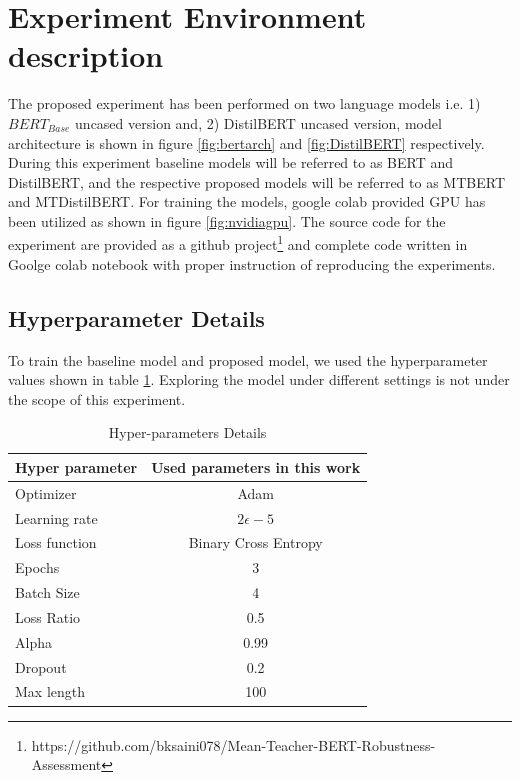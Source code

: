 \documentclass[%
	BCOR=8mm, %
	DIV=12,
	toc=bibliography, %
	toc=listof, %
	oneside, %
	egregdoesnotlikesansseriftitles, %
	]{scrbook}
\begin{document}
\section{Experiment Environment description}
\label{section: experimentenv}
The proposed experiment has been performed on two language models i.e. 1) $BERT_{Base}$ uncased version  and, 2) DistilBERT uncased version, model architecture is shown in figure \ref{fig:bertarch} and \ref{fig:DistilBERT} respectively. During this experiment baseline models will be referred to as BERT and DistilBERT, and the respective proposed models will be referred to as MTBERT and MTDistilBERT. For training the models, google colab provided GPU has been utilized as shown in figure \ref{fig:nvidiagpu}. The source code for the experiment are provided as a github project\footnote{https://github.com/bksaini078/Mean-Teacher-BERT-Robustness-Assessment} and complete code written in Goolge colab notebook with proper instruction of reproducing the experiments.
\subsection{Hyperparameter Details}
\label{subsection:hyperparameter}
To train the baseline model and proposed model, we used the hyperparameter values shown in table \ref{table:HyperparameterTable}. Exploring the model under different settings is not under the scope of this experiment. 
\begin{table}[H]
\centering
\begin{tabular}{ l c c }
\hline
Hyper parameter 		& \multicolumn{2}{c}{Used parameters in this work}\\
\hline
Optimizer 				& \multicolumn{2}{c}{Adam} \\
Learning rate 			& \multicolumn{2}{c}{ $2\epsilon -5$ } \\
Loss function 			& \multicolumn{2}{c}{Binary Cross Entropy}  \\
Epochs 				& \multicolumn{2}{c}{$3$} \\
Batch Size 			& \multicolumn{2}{c}{4 } \\
Loss Ratio 			&\multicolumn{2}{c}{0.5}\\
Alpha 			&\multicolumn{2}{c}{0.99}\\
Dropout  			& \multicolumn{2}{c}{0.2}  \\
Max length 			 & \multicolumn{2}{c}{100}  \\
\hline
\end{tabular}
\caption[Hyper-parameters Details]{Hyper-parameters Details}
\label{table:HyperparameterTable}
\end{table}
\end{document}
